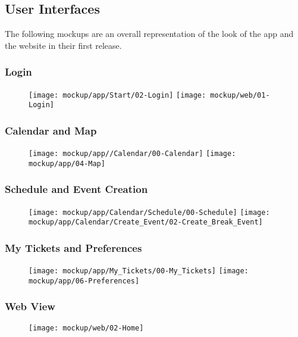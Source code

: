 \subsection{User Interfaces}
\label{subsect:User Interfaces}
	The following mockups are an overall representation of the look of the app and the website in their first release.
	\subsubsection{Login}
	\begin{figure}[H]
	\texttt{[image: mockup/app/Start/02-Login]}
	\vspace{2.5cm}
	\texttt{[image: mockup/web/01-Login]}
	\centering 
	\end{figure}
	
	\subsubsection{Calendar and Map}
	\begin{figure}[H]
	\texttt{[image: mockup/app//Calendar/00-Calendar]}
	\hspace{2.5cm}
	\texttt{[image: mockup/app/04-Map]}
	\centering 
	\end{figure}
	
	\subsubsection{Schedule and Event Creation}
	\begin{figure}[H]
	\texttt{[image: mockup/app/Calendar/Schedule/00-Schedule]}
	\hspace{2.5cm}
	\texttt{[image: mockup/app/Calendar/Create\_Event/02-Create\_Break\_Event]}
	\centering 
	\end{figure}
	
	\subsubsection{My Tickets and Preferences}
	\begin{figure}[H]
	\texttt{[image: mockup/app/My\_Tickets/00-My\_Tickets]}
	\hspace{2.5cm}
	\texttt{[image: mockup/app/06-Preferences]}
	\centering 
	\end{figure}
	
	\subsubsection{Web View}
	\begin{figure}[H]
	\texttt{[image: mockup/web/02-Home]}
	\centering
	\end{figure}
	

